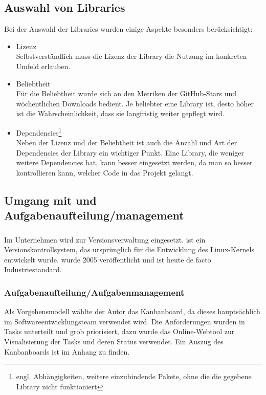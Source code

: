 \subsection{Auswahl von Libraries}

Bei der Auswahl der Libraries wurden einige Aspekte besonders berücksichtigt:

\begin{itemize}
    \item Lizenz\\
    Selbstverständlich muss die Lizenz der Library die Nutzung im konkreten Umfeld erlauben.
    \item Beliebtheit\\
    Für die Beliebtheit wurde sich an den Metriken der GitHub-Stars und wöchentlichen Downloads bedient. Je beliebter eine Library ist, desto höher ist die Wahrscheinlichkeit, dass sie langfristig weiter gepflegt wird.
    \item Dependencies\footnote{engl. Abhängigkeiten, weitere einzubindende Pakete, ohne die die gegebene Library nicht funktioniert}\\
    Neben der Lizenz und der Beliebtheit ist auch die Anzahl und Art der Dependencies der Library ein wichtiger Punkt. Eine Library, die weniger weitere Dependencies hat, kann besser eingesetzt werden, da man so besser kontrollieren kann, welcher Code in das Projekt gelangt.
\end{itemize}

\subsection{Umgang mit  und Aufgabenaufteilung/management}

\subsubsection{}

Im Unternehmen wird  zur Versionsverwaltung eingesetzt.  ist ein Versionskontrollsystem, das ursprünglich für die Entwicklung des Linux-Kernels entwickelt wurde.  wurde 2005 veröffentlicht und ist heute de facto Industriestandard.

\subsubsection{Aufgabenaufteilung/Aufgabenmanagement}

Als Vorgehensmodell wählte der Autor das Kanbanboard, da dieses hauptsächlich im Softwareentwicklungsteam verwendet wird. Die Anforderungen wurden in Tasks unterteilt und grob priorisiert, dazu wurde das Online-Webtool  zur Visualisierung der Tasks und deren Status verwendet.
Ein Auszug des Kanbanboards ist im Anhang zu finden.\todo


